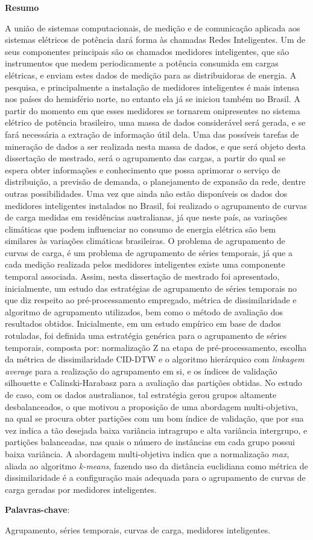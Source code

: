 \begin{center}
  \large{\textbf{Resumo}}
\end{center}

A união de sistemas computacionais, de medição e de comunicação aplicada aos sistemas elétricos de potência dará forma às chamadas Redes Inteligentes. Um de seus componentes principais são os chamados medidores inteligentes, que são instrumentos que medem periodicamente a potência consumida em cargas elétricas, e enviam estes dados de medição para as distribuidoras de energia. A pesquisa, e principalmente a instalação de medidores inteligentes é mais intensa nos países do hemisfério norte, no entanto ela já se iniciou também no Brasil. A partir do momento em que esses medidores se tornarem onipresentes no sistema elétrico de potência brasileiro, uma massa de dados considerável será gerada, e se fará necessária a extração de informação útil dela. Uma das possíveis tarefas de mineração de dados a ser realizada nesta massa de dados, e que será objeto desta dissertação de mestrado, será o agrupamento das cargas, a partir do qual se espera obter informações e conhecimento que possa aprimorar o serviço de distribuição, a previsão de demanda, o planejamento de expansão da rede, dentre outras possibilidades. Uma vez que ainda não estão disponíveis os dados dos medidores inteligentes instalados no Brasil, foi realizado o agrupamento de curvas de carga medidas em residências australianas, já que neste país, as variações climáticas que podem influenciar no consumo de energia elétrica são bem similares às variações climáticas brasileiras. O problema de agrupamento de curvas de carga, é um problema de agrupamento de séries temporais, já que a cada medição realizada pelos medidores inteligentes existe uma componente temporal associada. Assim, nesta dissertação de mestrado foi apresentado, inicialmente, um estudo das estratégias de agrupamento de séries temporais no que diz respeito ao pré-processamento empregado, métrica de dissimilaridade e algoritmo de agrupamento utilizados, bem como o método de avaliação dos resultados obtidos. Inicialmente, em um estudo empírico em base de dados rotuladas, foi definida uma estratégia genérica para o agrupamento de séries temporais, composta por: normalização Z na etapa de pré-processamento, escolha da métrica de dissimilaridade CID-DTW e o algoritmo hierárquico com \emph{linkagem average} para a realização do agrupamento em si, e os índices de validação silhouette e Calinski-Harabasz para a avaliação das partições obtidas. No estudo de caso, com os dados australianos, tal estratégia gerou grupos altamente desbalanceados, o que motivou a proposição de uma abordagem multi-objetiva, na qual se procura obter partições com um bom índice de validação, que por sua vez indica a tão desejada baixa variância intragrupo e alta variância intergrupo, e partições balanceadas, nas quais o número de instâncias em cada grupo possui baixa variância. A abordagem multi-objetiva indica que a normalização \emph{max}, aliada ao algoritmo \emph{k-means}, fazendo uso da distância euclidiana como métrica de dissimilaridade é a configuração mais adequada para o agrupamento de curvas de carga geradas por medidores inteligentes.

\vspace{.2cm}
\textbf{Palavras-chave}:

Agrupamento, séries temporais, curvas de carga, medidores inteligentes.
